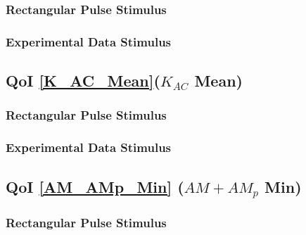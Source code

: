 \documentclass[12pt]{article}
\numberwithin{equation}{section}
\begin{document}
\subsubsection{Rectangular Pulse Stimulus}

\subsubsection{Experimental Data Stimulus}

\subsection{QoI \eqref{K_AC_Mean}($K_{AC}$ Mean)}

\subsubsection{Rectangular Pulse Stimulus}

\subsubsection{Experimental Data Stimulus}

\newpage
\subsection{QoI \eqref{AM_AMp_Min} ($AM+AM_p$ Min)}

\subsubsection{Rectangular Pulse Stimulus}
\end{document}

